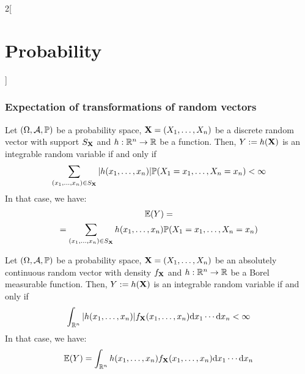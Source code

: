 \documentclass[../../../main.tex]{subfiles}
\begin{document}
\begin{multicols}{2}[\section{Probability}]
  \subsubsection{Expectation of transformations of random vectors}
  \begin{prop}
    Let $(\Omega,\mathcal{A},\mathbb{P})$ be a probability space, $\boldsymbol{\mathrm{X}}=(X_1,\ldots,X_n)$ be a discrete random vector with support $S_{\boldsymbol{\mathrm{X}}}$ and $h:\mathbb{R}^n\rightarrow\mathbb{R}$ be a function. Then, $Y:=h(\boldsymbol{\mathrm{X}})$ is an integrable random variable if and only if $$\sum_{(x_1,\ldots,x_n)\in S_{\boldsymbol{\mathrm{X}}}}|h(x_1,\ldots,x_n)|\mathbb{P}(X_1=x_1,\ldots,X_n=x_n)<\infty$$
    In that case, we have:
    \begin{multline*}
      \mathbb{E}(Y)=\\=\sum_{(x_1,\ldots,x_n)\in S_{\boldsymbol{\mathrm{X}}}}h(x_1,\ldots,x_n)\mathbb{P}(X_1=x_1,\ldots,X_n=x_n)
    \end{multline*}
  \end{prop}
  \begin{prop}
    Let $(\Omega,\mathcal{A},\mathbb{P})$ be a probability space, $\boldsymbol{\mathrm{X}}=(X_1,\ldots,X_n)$ be an absolutely continuous random vector with density $f_{\boldsymbol{\mathrm{X}}}$ and $h:\mathbb{R}^n\rightarrow\mathbb{R}$ be a Borel measurable function. Then, $Y:=h(\boldsymbol{\mathrm{X}})$ is an integrable random variable if and only if $$\int_{\mathbb{R}^n}|h(x_1,\ldots,x_n)|f_{\boldsymbol{\mathrm{X}}}(x_1,\ldots,x_n)\dd x_1\cdots\dd x_n<\infty$$
    In that case, we have:
    $$
      \mathbb{E}(Y)=\int_{\mathbb{R}^n}h(x_1,\ldots,x_n)f_{\boldsymbol{\mathrm{X}}}(x_1,\ldots,x_n)\dd x_1\cdots\dd x_n$$
  \end{prop}

\end{multicols}
\end{document}
